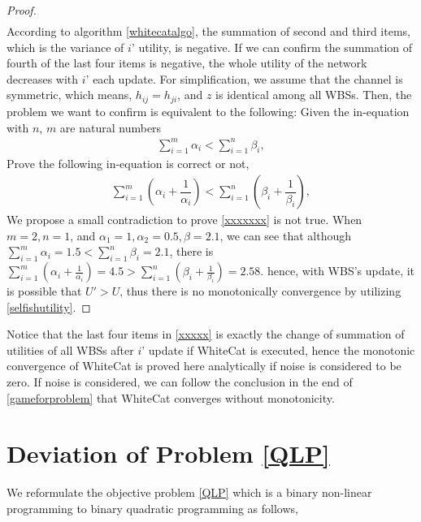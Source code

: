 \begin{appendices}
\begin{proof}
\begin{equation}
\begin{split}
\end{split}
\end{equation}
According to algorithm \ref{whitecatalgo}, the summation of second and third items, which is the variance of $i$' utility, is negative. If we can confirm the summation of fourth of the last four items is negative, the whole utility of the network decreases with $i$' each update. For simplification, we assume that the channel is symmetric, which means, $h_{ij}=h_{ji}$, and $z$ is identical among all WBSs. Then, the problem we want to confirm is equivalent to the following: Given the in-equation with $n$, $m$ are natural numbers
\begin{equation}
\label{xxxxxx}
\begin{split}	
\sum\limits_{i=1}^{m} \alpha_i < \sum\limits_{i=1}^{n} \beta_i,
\end{split}
\end{equation}
 Prove the following in-equation is correct or not,
\begin{equation}
\label{xxxxxxx}
\begin{split}	
\sum\limits_{i=1}^{m} (\alpha_i+\dfrac{1}{\alpha_i}) < \sum\limits_{i=1}^{n} (\beta_i+\dfrac{1}{\beta_i}),
\end{split}
\end{equation}
We propose a small contradiction to prove \ref{xxxxxxx} is not true.
When $m=2,n=1$, and $\alpha_1=1, \alpha_2=0.5, \beta=2.1$, we can see that although $\sum_{i=1}^m\alpha_i=1.5 < \sum_{i=1}^n\beta_i=2.1$, there is
$\sum_{i=1}^m(\alpha_i+\frac{1}{\alpha_i})=4.5 > \sum_{i=1}^n(\beta_i+\frac{1}{\beta_i})=2.58$.
hence, with WBS's update, it is possible that $U'> U$, thus there is no monotonically convergence by utilizing \ref{selfishutility}.
\end{proof}

Notice that the last four items in \ref{xxxxx} is exactly the change of summation of utilities of all WBSs after $i$' update if WhiteCat is executed, hence the monotonic convergence of WhiteCat is proved here analytically if noise is considered to be zero. If noise is considered, we can follow the conclusion in the end of \ref{gameforproblem} that WhiteCat converges without monotonicity.





\chapter{Deviation of Problem \ref{QLP}}
\label{optdeviation}
We reformulate the objective problem \ref{QLP} which is a binary non-linear programming to binary quadratic programming as follows,


\end{appendices}
